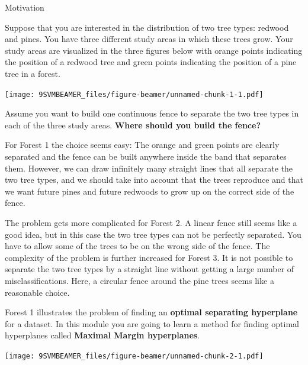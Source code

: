 \documentclass[ignorenonframetext,]{beamer}
\begin{document}
\begin{frame}

\begin{block}{Motivation}

Suppose that you are interested in the distribution of two tree types:
redwood and pines. You have three different study areas in which these
trees grow. Your study areas are visualized in the three figures below
with orange points indicating the position of a redwood tree and green
points indicating the position of a pine tree in a forest.

\end{block}

\end{frame}

\begin{frame}

\texttt{[image: 9SVMBEAMER\_files/figure-beamer/unnamed-chunk-1-1.pdf]}

Assume you want to build one continuous fence to separate the two tree
types in each of the three study areas. \textbf{Where should you build
the fence?}

\end{frame}

\begin{frame}

For Forest 1 the choice seems easy: The orange and green points are
clearly separated and the fence can be built anywhere inside the band
that separates them. However, we can draw infinitely many straight lines
that all separate the two tree types, and we should take into account
that the trees reproduce and that we want future pines and future
redwoods to grow up on the correct side of the fence.

The problem gets more complicated for Forest 2. A linear fence still
seems like a good idea, but in this case the two tree types can not be
perfectly separated. You have to allow some of the trees to be on the
wrong side of the fence. The complexity of the problem is further
increased for Forest 3. It is not possible to separate the two tree
types by a straight line without getting a large number of
misclassifications. Here, a circular fence around the pine trees seems
like a reasonable choice.

\end{frame}

\begin{frame}

Forest 1 illustrates the problem of finding an \textbf{optimal
separating hyperplane} for a dataset. In this module you are going to
learn a method for finding optimal hyperplanes called \textbf{Maximal
Margin hyperplanes}.

\texttt{[image: 9SVMBEAMER\_files/figure-beamer/unnamed-chunk-2-1.pdf]}

\end{frame}
\end{document}
